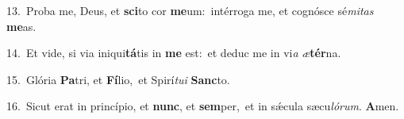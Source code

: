 {\numbfont\textcolor{\numbcolor}{13.}}~Proba me, Deus, et \textbf{sci}\-to cor \textbf{me}\-um:~\star intérroga me, et cognósce sé\-\textit{mi}\-\textit{tas} \textbf{me}\-as.\par
{\numbfont\textcolor{\numbcolor}{14.}}~Et vide, si via iniqui\-\textbf{tá}\-tis in \textbf{me} est:~\star et deduc me in vi\textit{a} \textit{æ}\-\textbf{tér}na.\par
{\numbfont\textcolor{\numbcolor}{15.}}~Glória \textbf{Pa}\-tri, et \textbf{Fí}\-lio,~\star et Spirí\-\textit{tu}\-\textit{i} \textbf{Sanc}\-to.\par
{\numbfont\textcolor{\numbcolor}{16.}}~Sicut erat in princípio, et \textbf{nunc}\-, et \textbf{sem}\-per,~\star et in sǽcula sæcu\-\textit{ló}\-\textit{rum}. \textbf{A}\-men.\par
